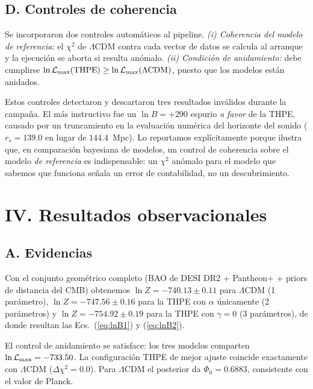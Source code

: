 \documentclass[aps,prd,twocolumn,superscriptaddress,nofootinbib,floatfix]{revtex4-2}
\newcommand{\LCDM}{\ensuremath{\Lambda}CDM}
\begin{document}
\subsection*{D. Controles de coherencia}

Se incorporaron dos controles autom\'aticos al pipeline.
\emph{(i) Coherencia del modelo de referencia:} el $\chi^2$ de \LCDM{}
contra cada vector de datos se calcula al arranque y la ejecuci\'on se
aborta si resulta an\'omalo. \emph{(ii) Condici\'on de anidamiento:}
debe cumplirse
$\ln\mathcal{L}_{\rm max}({\rm THPE})\ge
\ln\mathcal{L}_{\rm max}(\Lambda\mathrm{CDM})$, puesto que los modelos
est\'an anidados.

Estos controles detectaron y descartaron tres resultados inv\'alidos
durante la campa\~na. El m\'as instructivo fue un $\ln B=+290$ espurio
\emph{a favor} de la THPE, causado por un truncamiento en la
evaluaci\'on num\'erica del horizonte del sonido ($r_s=139.0$ en lugar
de $144.4$~Mpc). Lo reportamos expl\'icitamente porque ilustra que, en
comparaci\'on bayesiana de modelos, un control de coherencia sobre el
modelo \emph{de referencia} es indispensable: un $\chi^2$ an\'omalo
para el modelo que sabemos que funciona se\~nala un error de
contabilidad, no un descubrimiento.

\section*{IV. Resultados observacionales}

\subsection*{A. Evidencias}

Con el conjunto geom\'etrico completo (BAO de DESI DR2 + Pantheon+ +
priors de distancia del CMB) obtenemos $\ln Z=-740.13\pm0.11$ para
\LCDM{} (1 par\'ametro), $\ln Z=-747.56\pm0.16$ para la THPE con
$\alpha$ \'unicamente (2 par\'ametros) y $\ln Z=-754.92\pm0.19$ para la
THPE con $\gamma=0$ (3 par\'ametros), de donde resultan las
Ecs.~(\ref{eq:lnB1}) y (\ref{eq:lnB2}).

El control de anidamiento se satisface: los tres modelos comparten
$\ln\mathcal{L}_{\rm max}=-733.50$. La configuraci\'on THPE de mejor
ajuste coincide exactamente con \LCDM{} ($\Delta\chi^2=0.0$). Para
\LCDM{} el posterior da $\Phi_0=0.6883$, consistente con el valor de
Planck.
\end{document}
